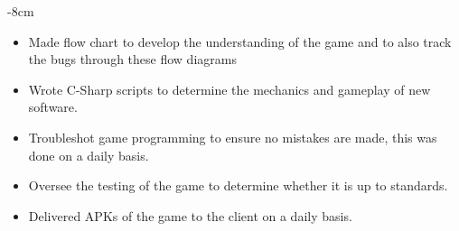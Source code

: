 \documentclass[10pt,a4paper]{altacv}
\begin{document}

\begin{adjustwidth}{}{-8cm}
\makecvheader
\end{adjustwidth}


\begin{itemize}
\item  Made flow chart to develop the understanding of the game
and to also track the bugs through these flow diagrams
\item Wrote C-Sharp scripts to determine the mechanics and
gameplay of new software.
\item Troubleshot game programming to ensure no mistakes are
made, this was done on a daily basis.
\item Oversee the testing of the game to determine whether it is
up to standards.
\item  Delivered APKs of the game to the client on a daily basis.
\end{itemize}




\end{document}
